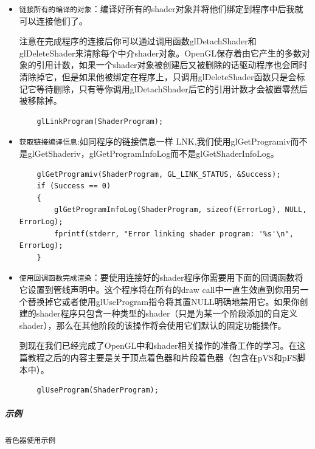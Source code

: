 \documentclass[UTF8,a4paper,8pt]{ctexbook}
\begin{document}
\begin{itemize}
			
			\item \verb|链接所有的编译的对象|：编译好所有的shader对象并将他们绑定到程序中后我就可以连接他们了。
			
			注意在完成程序的连接后你可以通过调用函数glDetachShader和glDeleteShader来清除每个中介shader对象。OpenGL保存着由它产生的多数对象的引用计数，如果一个shader对象被创建后又被删除的话驱动程序也会同时清除掉它，但是如果他被绑定在程序上，只调用glDeleteShader函数只是会标记它等待删除，只有等你调用glDetachShader后它的引用计数才会被置零然后被移除掉。
			\begin{lstlisting}
	glLinkProgram(ShaderProgram); 
			\end{lstlisting}
			
			\item \verb|获取链接编译信息|:如同程序的链接信息一样 LNK,我们使用glGetProgramiv而不是glGetShaderiv，glGetProgramInfoLog而不是glGetShaderInfoLog。
			\begin{lstlisting}
	glGetProgramiv(ShaderProgram, GL_LINK_STATUS, &Success); 
	if (Success == 0) 
	{ 
		glGetProgramInfoLog(ShaderProgram, sizeof(ErrorLog), NULL, ErrorLog); 
		fprintf(stderr, "Error linking shader program: '%s'\n", ErrorLog); 
	} 
			\end{lstlisting}
			
			\item \verb|使用回调函数完成渲染|：要使用连接好的shader程序你需要用下面的回调函数将它设置到管线声明中。这个程序将在所有的draw call中一直生效直到你用另一个替换掉它或者使用glUseProgram指令将其置NULL明确地禁用它。如果你创建的shader程序只包含一种类型的shader（只是为某一个阶段添加的自定义shader），那么在其他阶段的该操作将会使用它们默认的固定功能操作。
			
			到现在我们已经完成了OpenGL中和shader相关操作的准备工作的学习。在这篇教程之后的内容主要是关于顶点着色器和片段着色器（包含在pVS和pFS脚本中）。
			\begin{lstlisting}
	glUseProgram(ShaderProgram); 
			\end{lstlisting}
		\end{itemize}
		
		\subparagraph{示例}\verb|着色器使用示例|
		
\end{document}
